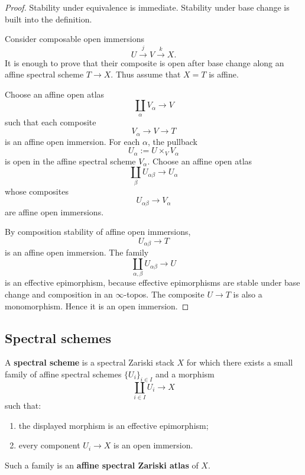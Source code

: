\begin{proof}
Stability under equivalence is immediate. Stability under base change is
built into the definition.

Consider composable open immersions
\[
    U
    \xrightarrow{j}
    V
    \xrightarrow{k}
    X.
\]
It is enough to prove that their composite is open after base change
along an affine spectral scheme $T\to X$. Thus assume that $X=T$ is
affine.

Choose an affine open atlas
\[
    \coprod_\alpha V_\alpha
    \longrightarrow
    V
\]
such that each composite
\[
    V_\alpha
    \longrightarrow
    V
    \longrightarrow
    T
\]
is an affine open immersion. For each $\alpha$, the pullback
\[
    U_\alpha
    :=
    U\times_VV_\alpha
\]
is open in the affine spectral scheme $V_\alpha$. Choose an affine open
atlas
\[
    \coprod_\beta U_{\alpha\beta}
    \longrightarrow
    U_\alpha
\]
whose composites
\[
    U_{\alpha\beta}
    \longrightarrow
    V_\alpha
\]
are affine open immersions.

By composition stability of affine open immersions,
\[
    U_{\alpha\beta}
    \longrightarrow
    T
\]
is an affine open immersion. The family
\[
    \coprod_{\alpha,\beta}
    U_{\alpha\beta}
    \longrightarrow
    U
\]
is an effective epimorphism, because effective epimorphisms are stable
under base change and composition in an $\infty$-topos. The composite
$U\to T$ is also a monomorphism. Hence it is an open immersion.
\end{proof}

\subsection{Spectral schemes}

\begin{definition}
\label{def:spectral-scheme}
A \textbf{spectral scheme} is a spectral Zariski stack $X$ for which there
exists a small family of affine spectral schemes $\{U_i\}_{i\in I}$ and a
morphism
\[
    \coprod_{i\in I}U_i
    \longrightarrow
    X
\]
such that:
\begin{enumerate}[label=(\roman*)]
    \item the displayed morphism is an effective epimorphism;

    \item every component $U_i\to X$ is an open immersion.
\end{enumerate}
Such a family is an \textbf{affine spectral Zariski atlas} of $X$.
\end{definition}

